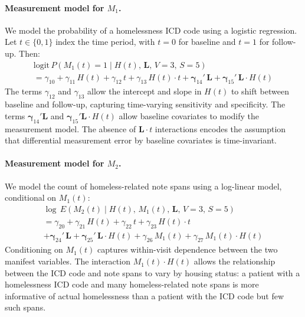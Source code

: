 \paragraph{Measurement model for $M_1$.} We model the probability of a homelessness ICD code using a logistic regression. Let $t \in \{0, 1\}$ index the time period, with $t=0$ for baseline and $t=1$ for follow-up. Then:
\begin{multline*}
    \text{logit}\, P(M_1(t) = 1 \mid H(t),\, \boldsymbol{L},\, V=3,\, S=5) \\
    = \gamma_{10} + \gamma_{11}\, H(t) + \gamma_{12}\, t + \gamma_{13}\, H(t) \cdot t + \boldsymbol{\gamma}_{14}'\, \boldsymbol{L} + \boldsymbol{\gamma}_{15}'\, \boldsymbol{L} \cdot H(t)
\end{multline*}
The terms $\gamma_{12}$ and $\gamma_{13}$ allow the intercept and slope in $H(t)$ to shift between baseline and follow-up, capturing time-varying sensitivity and specificity. The terms $\boldsymbol{\gamma}_{14}'\boldsymbol{L}$ and $\boldsymbol{\gamma}_{15}'\boldsymbol{L} \cdot H(t)$ allow baseline covariates to modify the measurement model. The absence of $\boldsymbol{L} \cdot t$ interactions encodes the assumption that differential measurement error by baseline covariates is time-invariant.

\paragraph{Measurement model for $M_2$.} We model the count of homeless-related note spans using a log-linear model, conditional on $M_1(t)$:
\begin{multline*}
    \log\, E(M_2(t) \mid H(t),\, M_1(t),\, \boldsymbol{L},\, V=3,\, S=5) \\
    = \gamma_{20} + \gamma_{21}\, H(t) + \gamma_{22}\, t + \gamma_{23}\, H(t) \cdot t \\
    + \boldsymbol{\gamma}_{24}'\, \boldsymbol{L} + \boldsymbol{\gamma}_{25}'\, \boldsymbol{L} \cdot H(t) + \gamma_{26}\, M_1(t) + \gamma_{27}\, M_1(t) \cdot H(t)
\end{multline*}
Conditioning on $M_1(t)$ captures within-visit dependence between the two manifest variables. The interaction $M_1(t) \cdot H(t)$ allows the relationship between the ICD code and note spans to vary by housing status: a patient with a homelessness ICD code and many homeless-related note spans is more informative of actual homelessness than a patient with the ICD code but few such spans.
